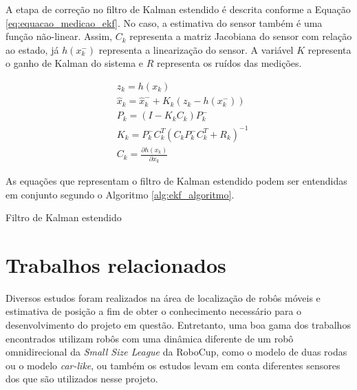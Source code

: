 \documentclass[acronym, symbols, table]{fei}
\begin{document}
			A etapa de correção no filtro de Kalman estendido é descrita conforme a Equação \eqref{eq:equacao_medicao_ekf}. No caso, a estimativa do sensor também é uma função não-linear. Assim, $C_k$ representa a matriz Jacobiana do sensor com relação ao estado, já $h(x_{k}^{-})$ representa a linearização do sensor. A variável $K$ representa o ganho de Kalman do sistema e $R$ representa os ruídos das medições.
			
			\begin{equation} \label{eq:equacao_medicao_ekf}
				\begin{split}
					&z_k = h(x_{k}) \\
					&\hat{x}_{k} = \hat{x}_{k}^{-} + K_{k}(z_k - h(x_{k}^{-})) \\
					&P_{k} = (I - K_{k}C_{k})P_{k}^{-} \\
					&K_k = P_{k}^{-}C_{k}^T(C_{k}P_{k}^{-}C_{k}^T + R_k)^{-1} \\
					&C_k = \frac{\partial h(x_k)}{\partial x_{k}}
				\end{split}
			\end{equation}
			
			As equações que representam o filtro de Kalman estendido podem ser entendidas em conjunto segundo o Algoritmo \ref{alg:ekf_algoritmo}.
			
			\begin{algorithm}
					\caption{Filtro de Kalman estendido}\label{alg:ekf_algoritmo}
			\end{algorithm}
			
\chapter{Trabalhos relacionados}\label{sec:trab_relacionados}
Diversos estudos foram realizados na área de localização de robôs móveis e estimativa de posição a fim de obter o conhecimento necessário para o desenvolvimento do projeto em questão. Entretanto, uma boa gama dos trabalhos encontrados utilizam robôs com uma dinâmica diferente de um robô omnidirecional da \textit{Small Size League} da RoboCup, como o modelo de duas rodas ou o modelo \textit{car-like}, ou também os estudos levam em conta diferentes sensores dos que são utilizados nesse projeto.
\end{document}
